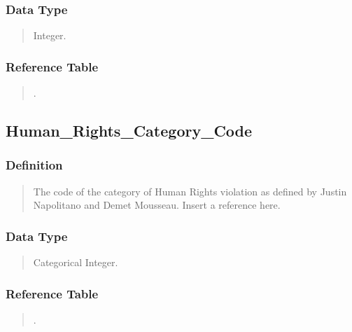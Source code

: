 \documentclass[letterpaper,10pt,english]{sphinxmanual}
\begin{document}
\subsubsection{Data Type}
\label{\detokenize{database_schema:id65}}\begin{quote}

\sphinxAtStartPar
Integer.
\end{quote}


\subsubsection{Reference Table}
\label{\detokenize{database_schema:id66}}\begin{quote}

\sphinxAtStartPar
{\hyperref[\detokenize{database_schema:overview-table}]{}}.
\end{quote}


\subsection{Human\_Rights\_Category\_Code}
\label{\detokenize{database_schema:human-rights-category-code}}

\subsubsection{Definition}
\label{\detokenize{database_schema:id67}}\begin{quote}

\sphinxAtStartPar
The code of the category of Human Rights violation as defined by Justin Napolitano and Demet Mousseau. Insert a reference here.
\end{quote}


\subsubsection{Data Type}
\label{\detokenize{database_schema:id68}}\begin{quote}

\sphinxAtStartPar
Categorical Integer.
\end{quote}


\subsubsection{Reference Table}
\label{\detokenize{database_schema:id69}}\begin{quote}

\sphinxAtStartPar
{\hyperref[\detokenize{database_schema:human-rights-category-table}]{}}.
\end{quote}
\end{document}
